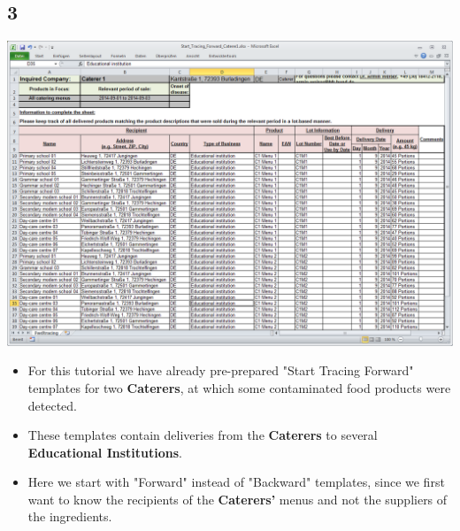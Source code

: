 \documentclass{beamer}
\begin{document}
\subsection{3}
\begin{frame}
	\begin{center}
  		\includegraphics[height=0.5\textheight]{3.png}
	\end{center}
	\begin{itemize}
		\item For this tutorial we have already pre-prepared "Start Tracing Forward" templates for two \textbf{Caterers}, at which some contaminated food products were detected.
		\item These templates contain deliveries from the \textbf{Caterers} to several \textbf{Educational Institutions}.
		\item Here we start with "Forward" instead of "Backward" templates, since we first want to know the recipients of the \textbf{Caterers'} menus and not the suppliers of the ingredients.
	\end{itemize}
\end{frame}
\end{document}
